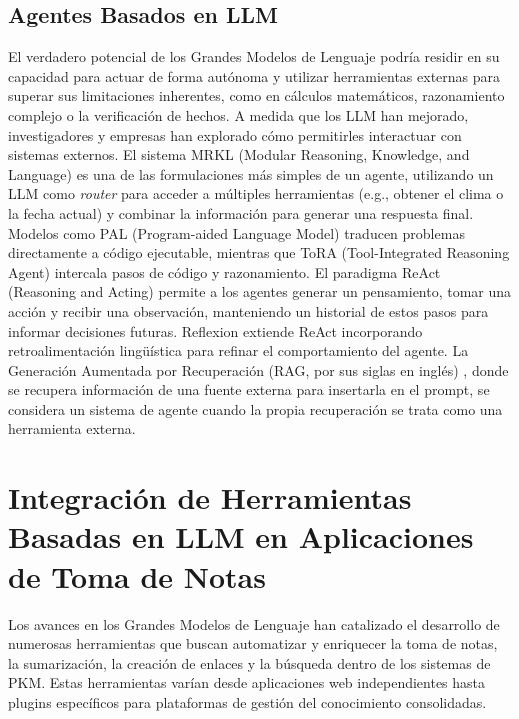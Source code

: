 \subsection{Agentes Basados en LLM}
\label{subsec:agentes_llm}
El verdadero potencial de los Grandes Modelos de Lenguaje podría residir en su capacidad para actuar de forma autónoma y utilizar herramientas externas para superar sus limitaciones inherentes, como en cálculos matemáticos, razonamiento complejo o la verificación de hechos. A medida que los LLM han mejorado, investigadores y empresas han explorado cómo permitirles interactuar con sistemas externos.
El sistema MRKL (Modular Reasoning, Knowledge, and Language) \parencite{karpasMRKLSystemsModular2022} es una de las formulaciones más simples de un agente, utilizando un LLM como \textit{router} para acceder a múltiples herramientas (e.g., obtener el clima o la fecha actual) y combinar la información para generar una respuesta final. Modelos como PAL (Program-aided Language Model) \parencite{gaoPALProgramaidedLanguage2023} traducen problemas directamente a código ejecutable, mientras que ToRA (Tool-Integrated Reasoning Agent) \parencite{gouToRAToolIntegratedReasoning2024} intercala pasos de código y razonamiento. El paradigma ReAct (Reasoning and Acting) \parencite{yaoReActSynergizingReasoning2023} permite a los agentes generar un pensamiento, tomar una acción y recibir una observación, manteniendo un historial de estos pasos para informar decisiones futuras. Reflexion \parencite{shinnReflexionLanguageAgents2023} extiende ReAct incorporando retroalimentación lingüística para refinar el comportamiento del agente. La Generación Aumentada por Recuperación (RAG, por sus siglas en inglés) \parencite{lewisRetrievalAugmentedGenerationKnowledgeIntensive2021}, donde se recupera información de una fuente externa para insertarla en el prompt, se considera un sistema de agente cuando la propia recuperación se trata como una herramienta externa.

\section{Integración de Herramientas Basadas en LLM en Aplicaciones de Toma de Notas}
\label{sec:integracion_llm_pkm}
Los avances en los Grandes Modelos de Lenguaje han catalizado el desarrollo de numerosas herramientas que buscan automatizar y enriquecer la toma de notas, la sumarización, la creación de enlaces y la búsqueda dentro de los sistemas de PKM. Estas herramientas varían desde aplicaciones web independientes hasta plugins específicos para plataformas de gestión del conocimiento consolidadas.

